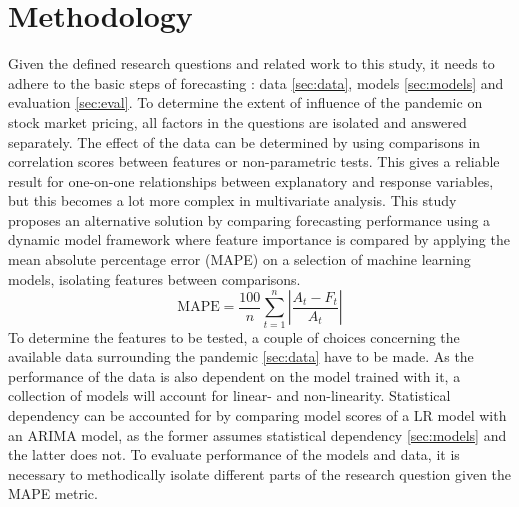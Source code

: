 \section{Methodology}
\label{sec:meth}
Given the defined research questions and related work to this study, it needs to adhere to the basic steps of forecasting \cite{hyndman2018forecasting, davydenko2021forecast}: data \ref{sec:data}, models \ref{sec:models} and evaluation \ref{sec:eval}.
To determine the extent of influence of the pandemic on stock market pricing, all factors in the questions are isolated and answered separately. The effect of the data can be determined by using comparisons in correlation scores between features or non-parametric tests. This gives a reliable result for one-on-one relationships between explanatory and response variables, but this becomes a lot more complex in multivariate analysis. This study proposes an alternative solution by comparing forecasting performance using a dynamic model framework where feature importance is compared by applying the mean absolute percentage error (MAPE) on a selection of machine learning models, isolating features between comparisons. $$\mbox{MAPE} = \frac{100}{n}\sum_{t=1}^n  \left|\frac{A_t-F_t}{A_t}\right|$$
To determine the features to be tested, a couple of choices concerning the available data surrounding the pandemic \ref{sec:data} have to be made. As the performance of the data is also dependent on the model trained with it, a collection of models will account for linear- and non-linearity. Statistical dependency can be accounted for by comparing model scores of a LR model with an ARIMA model, as the former assumes statistical dependency \ref{sec:models} and the latter does not. To evaluate performance of the models and data, it is necessary to methodically isolate different parts of the research question given the MAPE metric.

